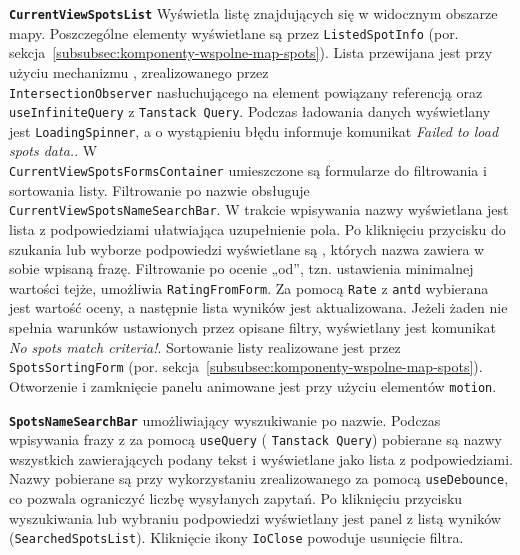 \textbf{\texttt{CurrentViewSpotsList}}
Wyświetla listę  znajdujących się w widocznym obszarze mapy.
Poszczególne elementy wyświetlane są przez \texttt{ListedSpotInfo} (por. sekcja~\ref{subsubsec:komponenty-wspolne-map-spots}).
Lista przewijana jest przy użyciu mechanizmu , zrealizowanego przez
\\ \texttt{IntersectionObserver} nasłuchującego na element powiązany referencją oraz 
\newline \texttt{useInfiniteQuery} z  \texttt{Tanstack Query}.
Podczas ładowania danych wyświetlany jest \texttt{LoadingSpinner}, a o wystąpieniu błędu informuje komunikat
\emph{Failed to load spots data.}.
W  \\ \texttt{CurrentViewSpotsFormsContainer} umieszczone są formularze
do filtrowania i sortowania listy.
Filtrowanie  po nazwie obsługuje \newline \texttt{CurrentViewSpotsNameSearchBar}.
W trakcie wpisywania nazwy wyświetlana jest lista z podpowiedziami ułatwiająca uzupełnienie pola.
Po kliknięciu przycisku do szukania lub wyborze podpowiedzi wyświetlane są , których nazwa
zawiera w sobie wpisaną frazę.
Filtrowanie po ocenie „od”, tzn. ustawienia minimalnej wartości tejże, umożliwia 
\texttt{RatingFromForm}.
Za pomocą \texttt{Rate} z  \texttt{antd} wybierana jest wartość oceny, a następnie
lista wyników jest aktualizowana.
Jeżeli żaden  nie spełnia warunków ustawionych przez opisane filtry, wyświetlany jest komunikat
\emph{No spots match criteria!}.
Sortowanie listy realizowane jest przez  \texttt{SpotsSortingForm}
(por. sekcja~\ref{subsubsec:komponenty-wspolne-map-spots}).
Otworzenie i zamknięcie panelu animowane jest przy użyciu elementów  \texttt{motion}.

\textbf{\texttt{SpotsNameSearchBar}}
 umożliwiający wyszukiwanie  po nazwie.
Podczas wpisywania frazy z  za pomocą  \texttt{useQuery}
( \texttt{Tanstack Query}) pobierane są nazwy wszystkich 
zawierających podany tekst i wyświetlane jako lista z podpowiedziami.
Nazwy pobierane są przy wykorzystaniu  zrealizowanego za pomocą  \texttt{useDebounce},
co pozwala ograniczyć liczbę wysyłanych zapytań.
Po kliknięciu przycisku wyszukiwania lub wybraniu podpowiedzi wyświetlany jest panel z listą wyników (\texttt{SearchedSpotsList}).
Kliknięcie ikony \texttt{IoClose} powoduje usunięcie filtra.

